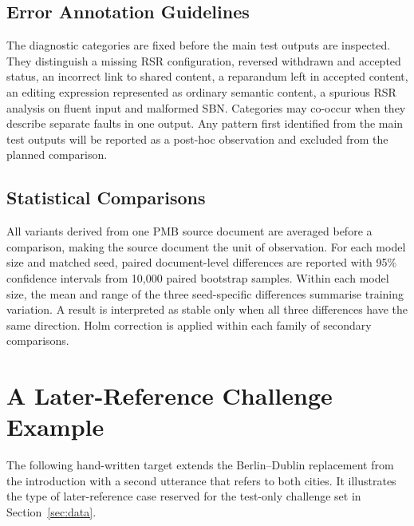 \subsection{Error Annotation Guidelines}
\label{app:model-errors}

The diagnostic categories are fixed before the main test outputs are
inspected. They distinguish a missing RSR configuration, reversed
withdrawn and accepted status, an incorrect link to shared content, a
reparandum left in accepted content, an editing expression represented as ordinary
semantic content, a spurious RSR analysis on fluent input and malformed SBN. Categories
may co-occur when they describe separate faults in one output. Any pattern
first identified from the main test outputs will be reported as a post-hoc
observation and excluded from the planned comparison.

\subsection{Statistical Comparisons}
\label{app:model-statistics}

All variants derived from one PMB source document are averaged before a
comparison, making the source document the unit of observation. For each model
size and matched seed, paired document-level differences are reported with
95\% confidence intervals from 10,000 paired bootstrap samples. Within each
model size, the mean and range of the three seed-specific differences
summarise training variation. A result is interpreted as stable only when all
three differences have the same direction. Holm correction is applied within
each family of secondary comparisons.

\section{A Later-Reference Challenge Example}
\label{app:later-reference}

The following hand-written target extends the Berlin--Dublin replacement from
the introduction with a second utterance that refers to both cities. It
illustrates the type of later-reference case reserved for the test-only
challenge set in Section~\ref{sec:data}.

